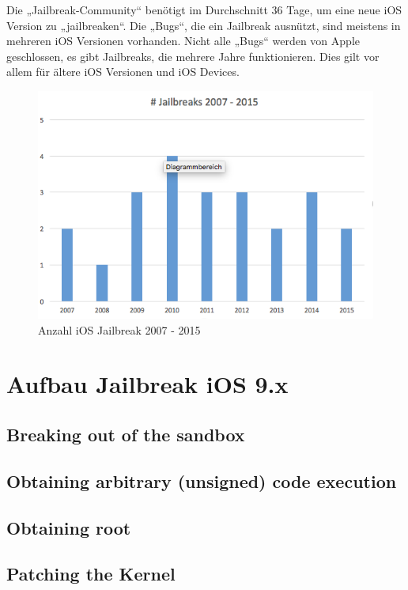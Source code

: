 \newpage
Die „Jailbreak-Community“ benötigt im Durchschnitt 36 Tage, um eine neue iOS Version zu „jailbreaken“. Die „Bugs“, die ein Jailbreak ausnützt, sind meistens in mehreren iOS Versionen vorhanden. Nicht alle „Bugs“ werden von Apple geschlossen, es gibt Jailbreaks, die mehrere Jahre funktionieren. Dies gilt vor allem für ältere iOS Versionen und iOS Devices.

\begin{figure}[!ht]
        \centering
                \includegraphics[scale=0.7]{Bilder/AnzahlJB}
        \caption{Anzahl iOS Jailbreak 2007 - 2015}
        	\label{fig:iOS Jailbreak}
\end{figure}


\section{Aufbau Jailbreak iOS 9.x}
\label{sec:JBAufbau}

\cite{TaiG[1]}
\cite{TaiG[2]}
\cite{TaiG[3]}

\subsection{Breaking out of the sandbox}
\label{sec:JBStep1}

\subsection{Obtaining arbitrary (unsigned) code execution}
\label{sec:JBStep2}

\subsection{Obtaining root}
\label{sec:JBStep3}

\subsection{Patching the Kernel}
\label{sec:JBStep4}
